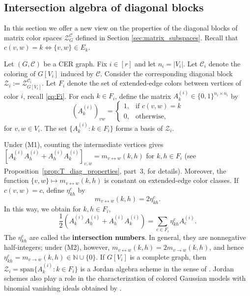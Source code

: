 \documentclass[12pt]{amsart}
\theoremstyle{plain}
\theoremstyle{definition}
\theoremstyle{remark}
\newcommand{\1}{\mathbf{1}}
\newcommand{\coloredZ}{\mathcal{Z}_{G}^{\mathcal{C}}}
\begin{document}
\subsection{Intersection algebra of diagonal blocks}\label{sec:intersection}

In this section we offer a new view on the properties of the diagonal blocks of matrix color spaces $\coloredZ$ defined in Section \ref{sec:matrix_subspaces}.
Recall that $c(v,w) = k \iff \{v,w\}\in E_k$.

Let \((G,\mathcal{C})\) be a CER graph.
Fix $i\in [r]$ and let $n_i=|V_i|$. Let $\mathcal{C}_i$ denote the coloring of $G[V_i]$ induced by $\mathcal{C}$.  Consider the corresponding diagonal block $\mathcal{Z}_i:=\mathcal{Z}_{G[V_i]}^{\mathcal{C}_i}$.
Let $F_i$ denote the set of extended-edge colors between vertices of color $i$, recall \eqref{eq:Fi}.  
For each $k\in F_i$, define the matrix $A_k^{(i)}\in\{0,1\}^{n_i\times n_i}$ by
\begin{equation}\label{eq:diagonal-color-matrices}
(A_k^{(i)})_{vw} =\begin{cases}
1, & \text{if }c(v,w) = k\\
0, & \text{otherwise},
\end{cases}
\end{equation}
for $v,w\in V_i$. The set $\{A_k^{(i)}\colon k\in F_i\}$ forms a basis of $\mathcal{Z}_i$.

Under (M1), counting the intermediate vertices gives
$[A_k^{(i)} A_h^{(i)} + A_h^{(i)} A_k^{(i)}]_{v,w}
= m_{v\leftrightarrow w}(k,h)$ for $k,h\in F_i$
(see Proposition~\ref{prop:T_diag_properties}, part~3, for details). Moreover, the function $\{v,w\}\mapsto m_{v\leftrightarrow w}(k,h)$ is constant on extended-edge color classes. If $c(v,w)=c$, define $\eta_{kh}^c$ by
\begin{equation}\label{eq:intersection-numbers}
m_{v\leftrightarrow w}(k,h)=2\eta_{kh}^c.
\end{equation}
In this way, we obtain for $k,h\in F_i$,
\[
\frac12(A_k^{(i)} A_h^{(i)} + A_h^{(i)} A_k^{(i)})= \sum_{c\in F_i} \eta_{kh}^c A_c^{(i)}. 
\]
The $\eta_{kh}^c$ are called the \textbf{intersection numbers}. In general, they are nonnegative half-integers; under (M2), however, $m_{v\leftrightarrow w}(k,h)=2m_{v\to w}(k,h)$, and hence $\eta_{kh}^c=m_{v\to w}(k,h)\in\mathbb{N}\cup\{0\}$.
If $G[V_i]$ is a complete graph, then $\mathcal{Z}_i=\mathrm{span}\{A_k^{(i)}\colon k\in F_i\}$ is a Jordan algebra scheme in the sense of \citet{JordanScheme0,JordanScheme1}.
Jordan schemes also play a role in the characterization of colored Gaussian
models with binomial vanishing ideals obtained by \citet{BDM26}.
\end{document}
